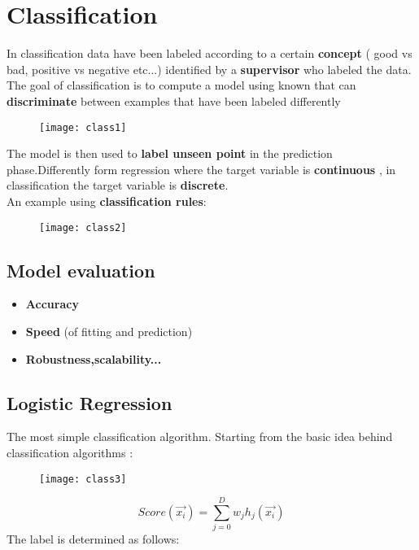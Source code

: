 \newpage
\section{Classification}
In classification data have been labeled according to a certain \textbf{concept} ( good vs bad, positive vs negative etc...) identified by a \textbf{supervisor} who labeled the data.\\
The goal of classification is to compute a model using known that can \textbf{discriminate} between examples that have been labeled differently
\begin{figure}[H]
  \centering
 \texttt{[image: class1]}
\end{figure}
The model is then used to \textbf{label unseen point} in the prediction phase.Differently form regression where the target variable is \textbf{continuous} , in classification the target variable is \textbf{discrete}.\\
An example using \textbf{classification rules}:
\begin{figure}[H]
  \centering
 \texttt{[image: class2]}
\end{figure}

\subsection{Model evaluation}
\begin{itemize}
\item \textbf{Accuracy}
\item \textbf{Speed} (of fitting and prediction)
\item \textbf{Robustness,scalability... }
\end{itemize}

\subsection{Logistic Regression}
The most simple classification algorithm. Starting from the basic idea behind classification algorithms :
\begin{figure}[H]
  \centering
 \texttt{[image: class3]}
\end{figure}
$$ Score(\overrightarrow{x_i})= \sum \limits_{j=0}^{D}w_jh_j(\overrightarrow{x_i})$$
The label is determined as follows:

